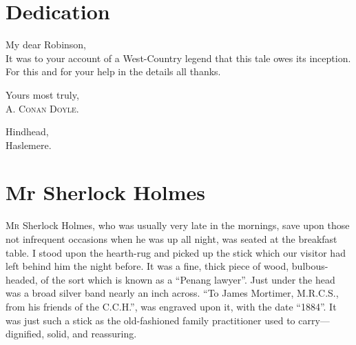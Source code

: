 \documentclass[paper=5.5in:8.5in,BCOR=7mm,twoside,DIV=calc,12pt,usegeometry,openany,chapterprefix,endperiod]{scrbook} %
\begin{document}
  \recalctypearea
\restoregeometry

\chapter*{Dedication}
\thispagestyle{empty}
My dear Robinson,\\

It was to your account of a West-Country legend that this tale owes its inception. For this and for your help in the details all thanks.

\begin{flushright}
Yours most truly,\\
\textsc{A. Conan Doyle.}
\end{flushright}

{\noindent Hindhead,\\}
    Haslemere.
  
\clearpage

\renewcommand*{\chapterpagestyle}{empty}
\setlength\cftparskip{5pt}
\setlength\cftbeforechapskip{0pt}
\renewcommand{\cftchapdotsep}{\cftdotsep}
\renewcommand{\cftchapfont}{\normalfont}
\renewcommand{\cftsecfont}{\normalfont}
\renewcommand{\cfttoctitlefont}{\hfill\Huge\bfseries}
\renewcommand{\cftaftertoctitle}{\hfill}
\renewcommand{\cftdot}{.}

\tableofcontents
\thispagestyle{empty}
\clearpage


\pagestyle{headings}
\renewcommand*{\chapterpagestyle}{plain}

\chapter{Mr Sherlock Holmes}
\lettrine[lines=1]{M}{r} Sherlock Holmes, who was usually very late in the mornings, save upon those not infrequent occasions when he was up all night, was seated at the breakfast table. I stood upon the hearth-rug and picked up the stick which our visitor had left behind him the night before. It was a fine, thick piece of wood, bulbous-headed, of the sort which is known as a \enquote{Penang lawyer}. Just under the head was a broad silver band nearly an inch across. \enquote{To James Mortimer, M.R.C.S., from his friends of the C.C.H.}, was engraved upon it, with the date \enquote{1884}. It was just such a stick as the old-fashioned family practitioner used to carry\nobreakdash---dignified, solid, and reassuring.
\end{document}
